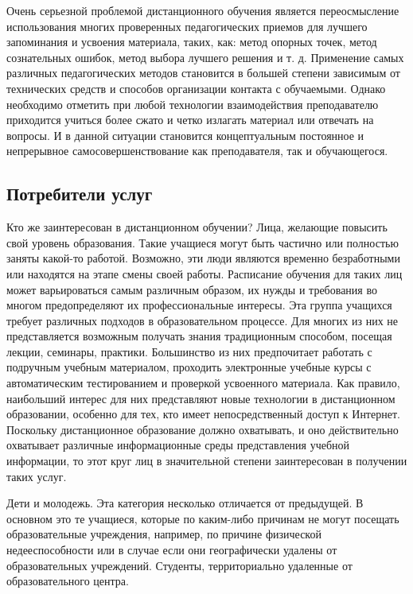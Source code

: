 Очень серьезной проблемой дистанционного обучения является переосмысление использования многих
проверенных педагогических приемов для лучшего запоминания и усвоения материала,
таких, как: метод опорных точек, метод сознательных ошибок, метод выбора лучшего
решения и т. д. Применение самых различных педагогических методов становится в большей
степени зависимым от технических средств и способов организации контакта с обучаемыми.
Однако необходимо отметить при любой технологии взаимодействия преподавателю приходится
учиться более сжато и четко излагать материал или отвечать на вопросы. И в данной ситуации
становится концептуальным постоянное и непрерывное самосовершенствование как преподавателя,
так и обучающегося.


\subsection{Потребители услуг}

Кто же заинтересован в дистанционном обучении? Лица, желающие повысить свой уровень образования.
Такие учащиеся могут быть частично или полностью заняты какой-то работой. Возможно, эти люди являются временно
безработными или находятся на этапе смены своей работы. Расписание обучения для таких лиц может варьироваться самым
различным образом, их нужды и требования во многом предопределяют их профессиональные интересы. Эта группа учащихся
требует различных подходов в образовательном процессе. Для многих из них не представляется возможным получать
знания традиционным способом, посещая лекции, семинары, практики. Большинство из них предпочитает работать с подручным
учебным материалом, проходить электронные учебные курсы с автоматическим тестированием и проверкой усвоенного материала.
Как правило, наибольший интерес для них представляют новые технологии в дистанционном образовании,
особенно для тех, кто имеет непосредственный доступ к Интернет. Поскольку дистанционное образование должно охватывать,
и оно действительно охватывает различные информационные среды представления учебной информации, то этот круг лиц
в значительной степени заинтересован в получении таких услуг.

Дети и молодежь. Эта категория несколько отличается от предыдущей. В основном это те учащиеся, которые по каким-либо
причинам не могут посещать образовательные учреждения, например, по причине физической недееспособности или в случае
если они географически удалены от образовательных учреждений. Студенты, территориально удаленные от образовательного центра.

